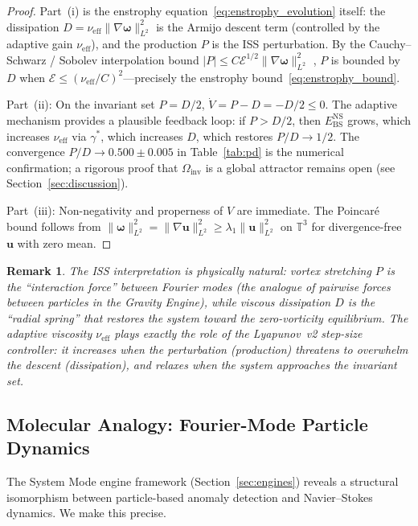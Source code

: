 \documentclass[final]{siamltex}
\newcommand{\T}{\mathbb{T}}
\newcommand{\norm}[1]{\lVert #1 \rVert}
\providecommand{\grad}{\nabla}
\newcommand{\Ebs}{E_{\mathrm{BS}}}
\newtheorem{remark}[theorem]{Remark}
\begin{document}
\begin{proof}
Part~(i) is the enstrophy equation~\eqref{eq:enstrophy_evolution}
itself: the dissipation $D = \nu_{\mathrm{eff}}\norm{\grad\bm{\omega}}_{L^2}^2$
is the Armijo descent term (controlled by the adaptive gain
$\nu_{\mathrm{eff}}$), and the production $P$ is the ISS
perturbation.  By the Cauchy--Schwarz / Sobolev interpolation bound
$|P| \le C\mathcal{E}^{1/2}\norm{\grad\bm{\omega}}_{L^2}^2$
\cite{lady1969}, $P$ is bounded by $D$ when
$\mathcal{E} \le (\nu_{\mathrm{eff}}/C)^2$---precisely the
enstrophy bound~\eqref{eq:enstrophy_bound}.

Part~(ii): On the invariant set $P = D/2$,
$\dot{V} = P - D = -D/2 \le 0$.  The adaptive mechanism provides
a plausible feedback loop:
if $P > D/2$, then $\Ebs^{\mathrm{NS}}$
grows, which increases $\nu_{\mathrm{eff}}$ via $\gamma^*$,
which increases $D$, which restores $P/D \to 1/2$.  The convergence
$P/D \to 0.500 \pm 0.005$ in Table~\ref{tab:pd} is the numerical
confirmation; a rigorous proof that $\Omega_{\mathrm{inv}}$ is a
global attractor remains open (see Section~\ref{sec:discussion}).

Part~(iii): Non-negativity and properness of $V$ are immediate.
The Poincar\'e bound follows from $\norm{\bm{\omega}}_{L^2}^2
= \norm{\grad\bm{u}}_{L^2}^2 \ge \lambda_1\norm{\bm{u}}_{L^2}^2$
on $\T^3$ for divergence-free $\bm{u}$ with zero mean.
\end{proof}

\begin{remark}\label{rem:ns_iss}
The ISS interpretation is physically natural: vortex stretching
$P$ is the ``interaction force'' between Fourier modes (the
analogue of pairwise forces between particles in the Gravity
Engine), while viscous dissipation $D$ is the ``radial spring''
that restores the system toward the zero-vorticity equilibrium.
The adaptive viscosity $\nu_{\mathrm{eff}}$ plays exactly the
role of the Lyapunov~v2 step-size controller: it increases when
the perturbation (production) threatens to overwhelm the descent
(dissipation), and relaxes when the system approaches the
invariant set.
\end{remark}

\subsection{Molecular Analogy: Fourier-Mode Particle
Dynamics}\label{sec:ns:molecular}

The System Mode engine framework (Section~\ref{sec:engines})
reveals a structural isomorphism between particle-based anomaly
detection and Navier--Stokes dynamics.  We make this precise.
\end{document}
